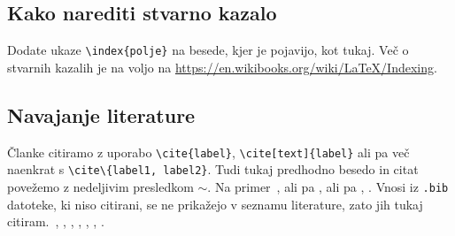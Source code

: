 \documentclass[12pt,a4paper,twoside]{article}
\newcommand{\literatura}{literatura}  %
\theoremstyle{definition} %
\theoremstyle{plain} %
\numberwithin{equation}{section}  %
\begin{document}
\subsection{Kako narediti stvarno kazalo}
Dodate ukaze \verb|\index{polje}| na besede, kjer je pojavijo, kot tukaj.
Več o stvarnih kazalih je na voljo na \url{https://en.wikibooks.org/wiki/LaTeX/Indexing}.

\subsection{Navajanje literature}
Članke citiramo z uporabo \verb|\cite{label}|, \verb|\cite[text]{label}| ali pa več naenkrat s
\verb|\cite\{label1, label2}|. Tudi tukaj predhodno besedo in citat povežemo z nedeljivim presledkom
$\sim$. Na primer~\cite{chen2006meshless,liu2001point}, ali pa \cite{kibriya2007empirical}, ali pa
\cite[str.\ 12]{trobec2015parallel}, \cite[enačba (2.3)]{pereira2016convergence}.
Vnosi iz \verb|.bib| datoteke, ki niso citirani, se ne prikažejo v seznamu literature, zato jih
tukaj citiram.~\cite{vene2000categorical}, \cite{gregoric2017stopniceni}, \cite{slak2015induktivni},
\cite{nsphere}, \cite{kearsley1975linearly}, \cite{STtemplate}, \cite{NunbergerTand}.

\cleardoublepage                           %

\cleardoublepage                           %
\printindex
\end{document}
